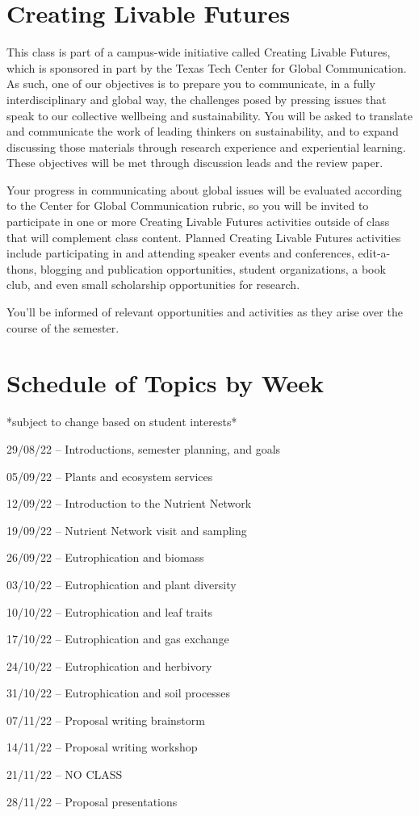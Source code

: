 \documentclass[12pt, notitlepage]{article}   	%
\begin{document}
{\section{Creating Livable Futures}
This class is part of a campus-wide initiative called Creating Livable Futures, 
which is sponsored in part by the Texas Tech Center for Global Communication. 
As such, one of our objectives is to prepare you to communicate, 
in a fully interdisciplinary and global way, the challenges posed by pressing issues 
that speak to our collective wellbeing and sustainability. You will be asked to translate 
and communicate the work of leading thinkers on sustainability, and to expand discussing 
those materials through research experience and experiential learning.
These objectives will be met through discussion leads and the review paper. 

Your progress in communicating about global issues will be evaluated according to the 
Center for Global Communication rubric, so you will be invited to participate 
in one or more Creating Livable Futures activities outside of class that will 
complement class content. 
Planned Creating Livable Futures activities include participating in and attending 
speaker events and conferences, edit-a-thons, blogging and publication opportunities, 
student organizations, a book club, and even small scholarship opportunities for research. 

You’ll be informed of relevant opportunities and activities as they arise over 
the course of the semester.

\newpage

\section*{Schedule of Topics by Week}
*subject to change based on student interests* \par
29/08/22 – Introductions, semester planning, and goals \par
05/09/22 – Plants and ecosystem services \par
12/09/22 – Introduction to the Nutrient Network \par
19/09/22 – Nutrient Network visit and sampling \par
26/09/22 – Eutrophication and biomass \par
03/10/22 – Eutrophication and plant diversity \par
10/10/22 – Eutrophication and leaf traits \par
17/10/22 – Eutrophication and gas exchange \par
24/10/22 – Eutrophication and herbivory \par
31/10/22 – Eutrophication and soil processes \par
07/11/22 – Proposal writing brainstorm \par
14/11/22 – Proposal writing workshop \par
21/11/22 – NO CLASS \par
28/11/22 – Proposal presentations \par

} %
\end{document}
